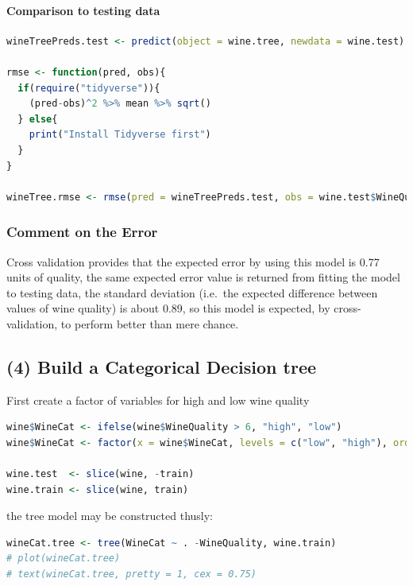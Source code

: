 \documentclass[
]{article}
\begin{document}
\hypertarget{comparison-to-testing-data}{%
\paragraph{Comparison to testing
data}\label{comparison-to-testing-data}}

\begin{lstlisting}[language=R]
wineTreePreds.test <- predict(object = wine.tree, newdata = wine.test)

rmse <- function(pred, obs){
  if(require("tidyverse")){
    (pred-obs)^2 %>% mean %>% sqrt()
  } else{
    print("Install Tidyverse first")
  }
}

wineTree.rmse <- rmse(pred = wineTreePreds.test, obs = wine.test$WineQuality)
\end{lstlisting}

\hypertarget{comment-on-the-error}{%
\subsubsection{Comment on the Error}\label{comment-on-the-error}}

Cross validation provides that the expected error by using this model is
0.77 units of quality, the same expected error value is returned from
fitting the model to testing data, the standard deviation (i.e.~the
expected difference between values of wine quality) is about 0.89, so
this model is expected, by cross-validation, to perform better than mere
chance.

\hypertarget{build-a-categorical-decision-tree}{%
\subsection{(4) Build a Categorical Decision
tree}\label{build-a-categorical-decision-tree}}

First create a factor of variables for high and low wine quality

\begin{lstlisting}[language=R]
wine$WineCat <- ifelse(wine$WineQuality > 6, "high", "low")
wine$WineCat <- factor(x = wine$WineCat, levels = c("low", "high"), ordered = TRUE, nmax = 2)

wine.test  <- slice(wine, -train)
wine.train <- slice(wine, train)
\end{lstlisting}

the tree model may be constructed thusly:

\begin{lstlisting}[language=R]
wineCat.tree <- tree(WineCat ~ . -WineQuality, wine.train)
# plot(wineCat.tree)
# text(wineCat.tree, pretty = 1, cex = 0.75)
\end{lstlisting}
\end{document}
